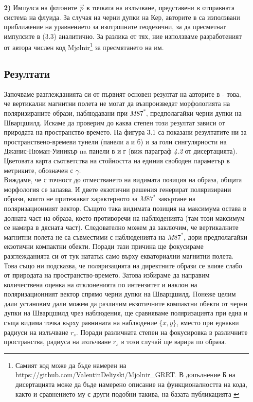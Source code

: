 \documentclass[12pt]{article}
\numberwithin{equation}{section}
\numberwithin{figure}{section}
\begin{document}
	\textbf{2)} Импулса на фотоните $\vec{p}$ в точката на излъчване, представени в отправната система на флуида. За случая на черни дупки на Кер, авторите в \cite{Narayan2021} са използвани приближение на уравнението за изотропните геодезични, за да пресметнат импулсите в (3.3) аналитично. За разлика от тях, ние използваме разработеният от автора числен код Mjølnir\footnote{Самият код може да бъде намерен на https://github.com/ValentinDeliyski/Mjolnir\_GRRT. В допълнение Б на дисертацията може да бъде намерено описание на функционалността на кода, както и сравнението му с други подобни такива, на базата публикацията \cite{Gold2020}} за пресмятането на им.
	
	\subsection{Резултати}
	
	Започваме разглежданията си от първият основен резултат на авторите в \cite{Narayan2021} - това, че вертикални магнитни полета не могат да възпроизведат морфологията на поляризираните образи, наблюдавани при $M87^*$, предполагайки черни дупки на Шварцшилд. Искаме да проверим до каква степен този резултат зависи от природата на пространство-времето. На фигура 3.1 са показани резултатите ни за пространствено-времеви тунели (панели а и б) и за голи сингулярности на Джанис-Нюман-Уиникър na панели в и г (виж параграф \emph{4.2} от дисертацията). Цветовата карта съответства на стойността на единия свободен параметър в метриките, обозначен с $\gamma$. \\
	
	Виждаме, че с точност до отместването на видимата позиция на образа, общата морфология се запазва. И двете екзотични решения генерират поляризирани образи, които не притежават характерното за $M87^*$ завъртане на поляризационният вектор. Същото така видимата позиция на максимума остава в долната част на образа, което противоречи на наблюденията (там този максимум се намира в дясната част). Следователно можем да заключим, че вертикалните магнитни полета не са съвместими с наблюденията на $M87^*$, дори предполагайки екзотични компактни обекти. Поради тази причина ще фокусираме разглежданията си от тук нататък само върху екваториални магнитни полета. \\
	
	Това също ни подсказва, че поляризацията на директните образи се влияе слабо от природата на пространство-времето. Затова избираме да направим количествена оценка на отклоненията по интензитет и наклон на поляризационният вектор спрямо черни дупки на Шварцшилд. Понеже целим дали установим дали можем да различим екзотичните компактни обекти от черни дупки на Шварцшилд чрез наблюдения, ще сравняваме поляризацията при една и съща видима точка върху равнината на наблюдение $\{x,y\}$, вместо при еднакви радиуси на излъчване $r_s$. Поради различната степен на фокусировка в различните пространства, радиуса на излъчване $r_s$ в този случай ще варира по образа.\\
\end{document}
